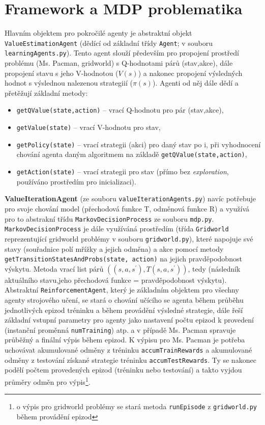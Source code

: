 \section{Framework a MDP problematika}
Hlavním objektem pro pokročilé agenty je abstraktní objekt \texttt{ValueEstimationAgent} (dědící od základní třídy \texttt{Agent}; v souboru \texttt{learningAgents.py}). Tento agent slouží především pro propojení prostředí problému (Ms. Pacman, gridworld) s Q-hodnotami párů (stav,akce), dále propojení stavu s jeho V-hodnotou ($V(s)$) a nakonec propojení výsledných hodnot s výslednou nalezenou strategiií ($\pi(s)$).
Agenti od něj dále dědí a přetěžují základní metody:
\begin{itemize}
\item \texttt{getQValue(state,action)} -- vrací Q-hodnotu pro pár (stav,akce),
\item \texttt{getValue(state)} -- vrací V-hodnotu pro stav,
\item \texttt{getPolicy(state)} -- vrací strategii (akci) pro daný stav po i, při vyhodnocení chování agenta daným algoritmem na základě \texttt{getQValue(state,action)},
\item \texttt{getAction(state)} -- vrací strategii pro stav (přímo bez \textit{exploration}, používáno prostředím pro inicializaci).
\end{itemize}
\textbf{ValueIterationAgent} (ze souboru \texttt{valueIterationAgents.py}) navíc potřebuje pro svoje chování model (přechodová funkce T, odměnová funkce R) a využívá pro to abstrakní třídu \texttt{MarkovDecisionProcess} ze souboru \texttt{mdp.py}. \texttt{MarkovDecisionProcess} je dále využíváná prostředím (třída \texttt{Gridworld} reprezentující gridworld problémy v souboru \texttt{gridworld.py}), které napojuje své stavy (souřadnice polí mřížky a jejich odměna) a akce pomocí metody \texttt{getTransitionStatesAndProbs(state, action)} na jejich pravděpodobnost výskytu. Metoda vrací list párů $((s,a,s^\prime),T(s,a,s^\prime))$, tedy (následník aktuálního stavu,jeho přechodová funkce = pravděpodobnost výskytu).
Abstraktní \texttt{ReinforcementAgent}, který je základním objektem pro všechny agenty strojového učení, se stará o chování učícího se agenta během průběhu jednotlivých epizod tréninku a během provádění výsledné strategie, dále řeší základní vstupní parametry pro agenty jako nastavení počtu epizod k provedení (instanční proměnná \texttt{numTraining}) atp. a v případě Ms. Pacman spravuje průběžný a finální výpis během epizod. K výpisu pro Ms. Pacman je potřeba uchovávat akumulované odměny z tréninku \texttt{accumTrainRewards} a akumulované odměny z testování získané strategie tréninku \texttt{accumTestRewards}. Ty se nakonec podělí počtem provedených epizod (tréninku nebo testování) a takto vyjdou průměry odměn pro výpis\footnote{o výpis pro gridworld problémy se stará metoda \texttt{runEpisode} z \texttt{gridworld.py} během provádění epizod}.
